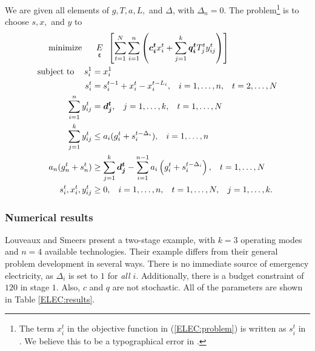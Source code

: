We are given all elements of $g, T, a, L,$ and $\Delta$, with $\Delta_n = 0$.  The problem\footnote{The term $x_i^t$ in the objective function in (\ref{ELEC:problem}) is written as $s_i^t$ in \cite{smeers88}.  We believe this to be a typographical error in \cite{smeers88}.} is to choose $s, x,$ and $y$ to
{\allowdisplaybreaks
\begin{equation}
\label{ELEC:problem}
\begin{split}
\mbox{minimize }\hspace{3mm}&\expect[\xi]\left[ \sum_{t=1}^N  \sum_{i=1}^n \left(\rand{c_i^t} x_i^t + \sum_{j=1}^k \rand{q_i^t} T_j^t y_{ij}^t\right) \right]\\
\mbox{subject to }\hspace{3mm} s_i^1 &= x_i^1\\
s_i^t &= s_i^{t-1} + x_i^t - x_i^{t-L_i},  \hspace{3mm} i=1,\ldots,n,  \hspace{3mm} t=2,\ldots, N\\
\sum_{i=1}^n y_{ij}^t &= \rand{d_j^t}, \hspace{3mm} j=1,\ldots,k, \hspace{3mm} t=1,\ldots,N\\
\sum_{j=1}^k y_{ij}^t &\leq a_i(g_i^t + s_i^{t-\Delta_i}), \hspace{3mm} i=1,\ldots,n\\
a_n(g_n^t + s_n^{t})&\geq \sum_{j=1}^k \rand{d_j^t} - \sum_{i=1}^{n-1}a_i\left( g_i^t + s_i^{t-\Delta_i}\right), \hspace{3mm} t=1,\ldots, N\\
s_i^t, x_i^t, y_{ij}^t &\geq 0, \hspace{3mm} i=1,\ldots,n,  \hspace{3mm} t=1,\ldots, N,\hspace{3mm} j=1,\ldots,k.
\end{split}
\end{equation}
}



\subsubsection{Numerical results}

Louveaux and Smeers \cite{smeers88} present a two-stage example, with $k=3$ operating modes and $n=4$ available technologies.  Their example differs from their general problem development in several ways.  There is no immediate source of emergency electricity, as $\Delta_i$ is set to $1$ for \emph{all $i$}.  Additionally, there is a budget constraint of $120$ in stage $1$.  Also, $c$ and $q$ are not stochastic.  All of the parameters are shown in Table \ref{ELEC:results}.


